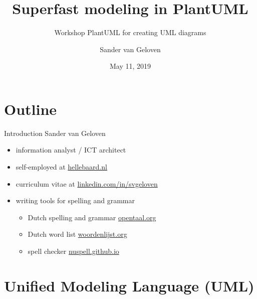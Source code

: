 \documentclass{beamer}
\title{Superfast modeling in PlantUML}
\subtitle{Workshop PlantUML for creating UML diagrams}
\author{Sander van Geloven}
\institute{Hellebaard}
\date{May 11, 2019}
\begin{document}
\begin{frame}
\titlepage
\end{frame}

\section*{Outline}
\begin{frame}
\tableofcontents
\end{frame}



\begin{frame}{Introduction}
Sander van Geloven
\\\mbox{}
\begin{itemize}
\item information analyst / ICT architect
\\\mbox{}
\item self-employed at \href{http://hellebaard.nl}{hellebaard.nl}
\\\mbox{}
\item curriculum vitae at \href{https://linkedin.com/in/svgeloven}{linkedin.com/in/svgeloven}
\\\mbox{}
\item writing tools for spelling and grammar 
\\\mbox{}
\begin{itemize}
\item Dutch spelling and grammar \href{http://opentaal.org}{opentaal.org}
\item Dutch word list \href{http://woordenlijst.org}{woordenlijst.org}
\item spell checker \href{https://nuspell.github.io}{nuspell.github.io}
\end{itemize}
\end{itemize}
\end{frame}



\section{Unified Modeling Language (UML)}
\end{document}
